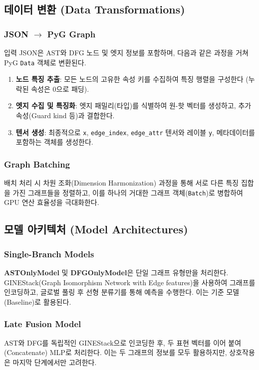 \subsection{데이터 변환 (Data Transformations)}

\subsubsection{JSON $\rightarrow$ PyG Graph}
입력 JSON은 AST와 DFG 노드 및 엣지 정보를 포함하며, 다음과 같은 과정을 거쳐 PyG \texttt{Data} 객체로 변환된다.

\begin{enumerate}
    \item \textbf{노드 특징 추출}: 모든 노드의 고유한 속성 키를 수집하여 특징 행렬을 구성한다 (누락된 속성은 0으로 패딩).
    \item \textbf{엣지 수집 및 특징화}: 엣지 패밀리(타입)를 식별하여 원-핫 벡터를 생성하고, 추가 속성(Guard kind 등)과 결합한다.
    \item \textbf{텐서 생성}: 최종적으로 \texttt{x}, \texttt{edge\_index}, \texttt{edge\_attr} 텐서와 레이블 \texttt{y}, 메타데이터를 포함하는 객체를 생성한다.
\end{enumerate}

\subsubsection{Graph Batching}
배치 처리 시 차원 조화(Dimension Harmonization) 과정을 통해 서로 다른 특징 집합을 가진 그래프들을 정렬하고, 이를 하나의 거대한 그래프 객체(\texttt{Batch})로 병합하여 GPU 연산 효율성을 극대화한다.


\subsection{모델 아키텍처 (Model Architectures)}

\subsubsection{Single-Branch Models}
\textbf{ASTOnlyModel} 및 \textbf{DFGOnlyModel}은 단일 그래프 유형만을 처리한다. GINEStack(Graph Isomorphism Network with Edge features)을 사용하여 그래프를 인코딩하고, 글로벌 풀링 후 선형 분류기를 통해 예측을 수행한다. 이는 기준 모델(Baseline)로 활용된다.

\subsubsection{Late Fusion Model}
AST와 DFG를 독립적인 GINEStack으로 인코딩한 후, 두 표현 벡터를 이어 붙여(Concatenate) MLP로 처리한다. 이는 두 그래프의 정보를 모두 활용하지만, 상호작용은 마지막 단계에서만 고려한다.

